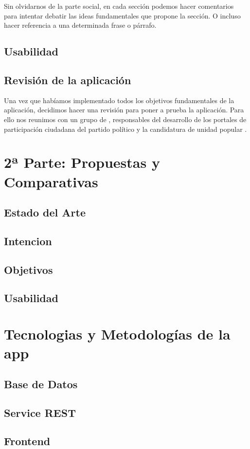 Sin olvidarnos de la parte social, en cada sección podemos hacer comentarios para intentar debatir las ideas fundamentales que propone la sección. O incluso hacer referencia a una determinada frase o párrafo.
	\subsection{Usabilidad}
	
	\subsection{Revisión de la aplicación}
Una vez que habíamos implementado todos los objetivos fundamentales de la aplicación, decidimos hacer una revisión para poner a prueba la aplicación. Para ello nos reunimos con un grupo de \cite{ref:labodemo}, responsables del desarrollo de los portales de participación ciudadana del partido político \cite{ref:podemos} y la candidatura de unidad popular \cite{ref:ahoramadrid}.



  
\section{2ª Parte: Propuestas y Comparativas}
  \subsection{Estado del Arte}

  \subsection{Intencion}
  \subsection{Objetivos}
  \subsection{Usabilidad}

  
  
\section{Tecnologias y Metodologías de la app}

  \subsection{Base de Datos}
  \subsection{Service REST}

  \subsection{Frontend}
